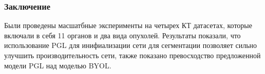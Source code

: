     


\subsubsection*{Заключение}
Были проведены масшатбные эксперименты на четырех КТ датасетах, которые включали в себя 
11 органов и два вида опухолей. Результаты показали, что использование PGL для инифиализации 
сети для сегментации позволяет сильно улучшить производительность сети, также показано 
превосходство предложенной модели PGL над моделью BYOL.